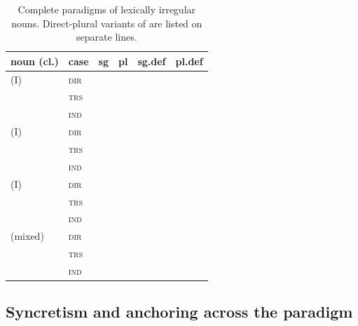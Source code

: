 \begin{table}[ht]
  \footnotesize
  \caption{Complete paradigms of lexically irregular nouns. Direct-plural variants of  are listed on separate lines.}
  \label{tab:nm-irregular-paradigms}
  \begin{tabularx}{\textwidth}{l l L L L L}
    \toprule
    {\sc noun (cl.)} & {\sc case} & {\sc sg} & {\sc pl}
      & {\sc sg.def} & {\sc pl.def} \\
    \midrule
     (I) & \textsc{dir} &  &  &  &  \\
     & \textsc{trs} &  &  &  &  \\
     & \textsc{ind} &  &  &  &  \\
    \addlinespace
     (I) & \textsc{dir} &  &  &  &  \\
     & \textsc{trs} &  &  &  &  \\
     & \textsc{ind} &  &  &  &  \\
    \addlinespace
     (I) & \textsc{dir} &  &  &  &  \\
     & \textsc{trs} &  &  &  &  \\
     & \textsc{ind} &  &  &  &  \\
    \addlinespace
     (mixed) & \textsc{dir} &  &  &  &  \\
     & \textsc{trs} &  &  &  &  \\
     & \textsc{ind} &  &  &  &  \\
    \bottomrule
  \end{tabularx}
\end{table}
\FloatBarrier

\subsection{Syncretism and anchoring across the paradigm}
\label{sec:nm-syncretism}

